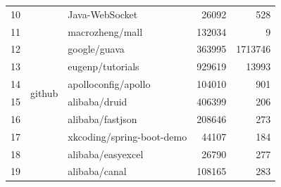 \begin{table}
\begin{tabular}{|r|l|l|r|r|}
		10          & \multirow{22}{*}{github}     & Java-WebSocket                                                                               & 26092                   & 528                     \\ \cline{1-1} \cline{3-5} 
		11          &                              & macrozheng/mall                                                                              & 132034                  & 9                       \\ \cline{1-1} \cline{3-5} 
		12          &                              & google/guava                                                                                 & 363995                  & 1713746                 \\ \cline{1-1} \cline{3-5} 
		13          &                              & eugenp/tutorials                                                                             & 929619                  & 13993                   \\ \cline{1-1} \cline{3-5} 
		14          &                              & apolloconfig/apollo                                                                          & 104010                  & 901                     \\ \cline{1-1} \cline{3-5} 
		15          &                              & alibaba/druid                                                                                & 406399                  & 206                     \\ \cline{1-1} \cline{3-5} 
		16          &                              & alibaba/fastjson                                                                             & 208646                  & 273                     \\ \cline{1-1} \cline{3-5} 
		17          &                              & xkcoding/spring-boot-demo                                                                    & 44107                   & 184                     \\ \cline{1-1} \cline{3-5} 
		18          &                              & alibaba/easyexcel                                                                            & 26790                   & 277                     \\ \cline{1-1} \cline{3-5} 
		19          &                              & alibaba/canal                                                                                & 108165                  & 283                     \\ \cline{1-1} \cline{3-5} 

\end{tabular}
\end{table}
